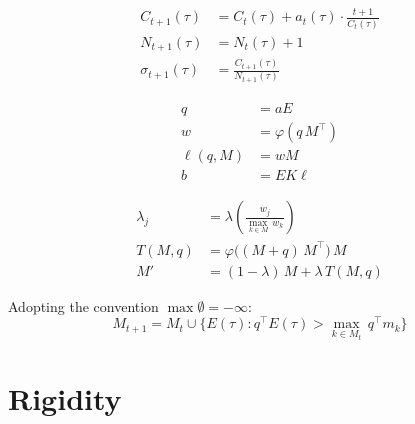\begin{definition}
\label{def:accumulation}
\leanok
\begin{align}
C_{t+1}(\tau) &= C_t(\tau) + a_t(\tau) \cdot \frac{t+1}{C_t(\tau)} \\
N_{t+1}(\tau) &= N_t(\tau) + 1 \\
\sigma_{t+1}(\tau) &= \frac{C_{t+1}(\tau)}{N_{t+1}(\tau)}
\end{align}
\end{definition}

\begin{definition}
\label{def:retrieval}
\leanok
\begin{align}
q &= aE \\
w &= \varphi(q\,M^\top) \\
\ell(q, M) &= wM \\
b &= EK\ell
\end{align}
\end{definition}

\begin{definition}
\label{def:consolidation}
\leanok
{}
\begin{align}
\lambda_j &= \lambda\!\left(\frac{w_j}{\max_{k \in M}\,w_k}\right) \\
T(M, q) &= \varphi\bigl((M + q)\,M^\top\bigr)\,M \\
M' &= (1 - \lambda)\,M + \lambda\,T(M, q)
\end{align}
\end{definition}

\begin{definition}
\label{def:capture}
\leanok
{}
Adopting the convention $\max \emptyset = -\infty$:
\begin{equation}
M_{t+1} = M_t \cup \{E(\tau) : q^\top E(\tau) > \max_{k \in M_t}\,q^\top m_k\}
\end{equation}
\end{definition}

\chapter{Rigidity}\label{ch:rigidity}

